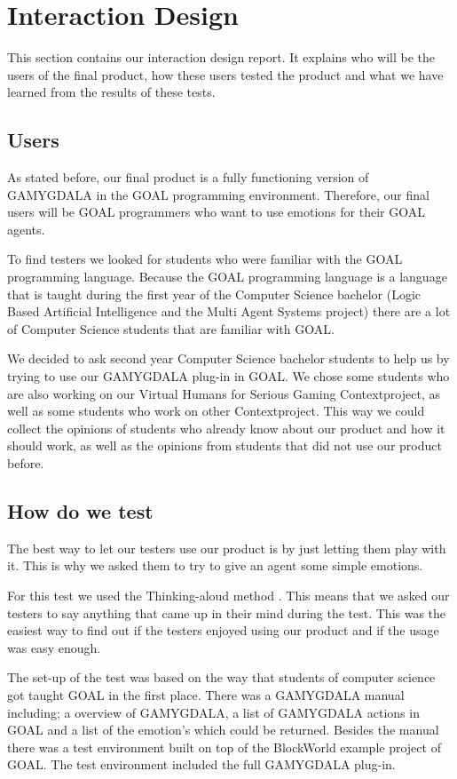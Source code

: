 \documentclass[12pt,a4paper]{article}
\begin{document}
\section{Interaction Design}
This section contains our interaction design report. It explains who will be the users of the final product, how these users tested the product and what we have learned from the results of these tests.

\subsection{Users}
As stated before, our final product is a fully functioning version of GAMYGDALA in the GOAL programming environment. Therefore, our final users will be GOAL programmers who want to use emotions for their GOAL agents. \par
To find testers we looked for students who were familiar with the GOAL programming language. Because the GOAL programming language is a language that is taught during the first year of the Computer Science bachelor (Logic Based Artificial Intelligence and the Multi Agent Systems project) there are a lot of Computer Science students that are familiar with GOAL. \par
We decided to ask second year Computer Science bachelor students to help us by trying to use our GAMYGDALA plug-in in GOAL. We chose some students who are also working on our Virtual Humans for Serious Gaming Contextproject, as well as some students who work on other Contextproject. This way we could collect the opinions of students who already know about our product and how it should work, as well as the opinions from students that did not use our product before.

\subsection{How do we test}
The best way to let our testers use our product is by just letting them play with it. This is why we asked them to try to give an agent some simple emotions. \par
For this test we used the Thinking-aloud method \citep{thinking-aloud}. This means that we asked our testers to say anything that came up in their mind during the test. This was the easiest way to find out if the testers enjoyed using our product and if the usage was easy enough.\par
The set-up of the test was based on the way that students of computer science got taught GOAL in the first place. There was a GAMYGDALA manual including; a overview of GAMYGDALA, a list of GAMYGDALA actions in GOAL and a list of the emotion's which could be returned. Besides the manual there was a test environment built on top of the BlockWorld example project of GOAL. The test environment included the full GAMYGDALA plug-in.
\end{document}

